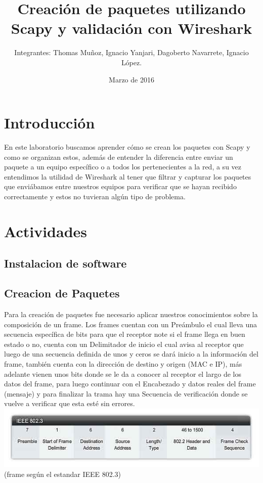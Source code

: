 \documentclass{udpreport}
\title{Creación de paquetes utilizando Scapy y validación con Wireshark}
\author{Integrantes: Thomas Muñoz, Ignacio Yanjari, Dagoberto Navarrete, Ignacio López.}
\date{Marzo de 2016}
\begin{document}
\maketitle
\tableofcontents
\chapter{Introducción}
	En este laboratorio buscamos aprender cómo se crean los paquetes con Scapy y como se organizan estos, además de entender la
	diferencia entre enviar un paquete a un equipo específico o a todos los pertenecientes a la red, a su vez entendimos la
	utilidad de Wireshark al tener que filtrar y capturar los paquetes que enviábamos entre nuestros equipos para verificar que se
	hayan recibido correctamente y estos no tuvieran algún tipo de problema.
\chapter{Actividades}
	\section{Instalacion de software}

	\section{Creacion de Paquetes}
		Para la creación de paquetes fue necesario aplicar nuestros conocimientos sobre la composición de un frame.
		Los frames cuentan con un Preámbulo el cual lleva una secuencia específica de bits para que el receptor note si el
		frame llega en buen estado o no, cuenta con un Delimitador de inicio el cual avisa al receptor que luego de una
		secuencia definida de unos y ceros se dará inicio a la información del frame, también cuenta con la dirección de
		destino y origen (MAC e IP), más adelante vienen unos bits donde se le da a conocer al receptor el largo de los datos
		del frame, para luego continuar con el Encabezado y datos reales del frame (mensaje) y para finalizar la trama hay una
		Secuencia de verificación donde se vuelve a verificar que esta esté sin errores.\\
		
		\includegraphics[width=\textwidth]{frame.jpg}\\
		(frame según el estandar IEEE 802.3)
\end{document}
